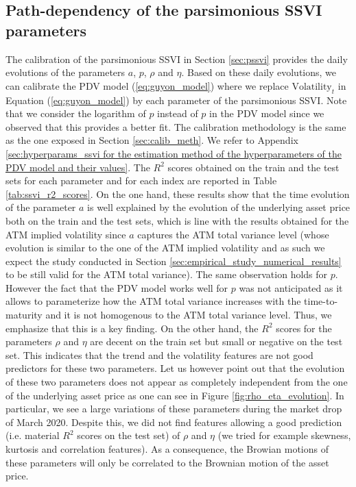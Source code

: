 \subsection{Path-dependency of the parsimonious SSVI parameters}\label{sec:pdv_ssvi_params}
The calibration of the parsimonious SSVI in Section \ref{sec:pssvi} provides the daily evolutions of the parameters $a$, $p$, $\rho$ and $\eta$. Based on these daily evolutions, we can calibrate the PDV model (\ref{eq:guyon_model}) where we replace $\text{Volatility}_t$ in Equation (\ref{eq:guyon_model}) by each parameter of the parsimonious SSVI. Note that we consider the logarithm of $p$ instead of $p$ in the PDV model since we observed that this provides a better fit. The calibration methodology is the same as the one exposed in Section \ref{sec:calib_meth}. We refer to Appendix \ref{sec:hyperparams_ssvi for the estimation method of the hyperparameters of the PDV model and their values}. The $R^2$ scores obtained on the train and the test sets for each parameter and for each index are reported in Table \ref{tab:ssvi_r2_scores}. On the one hand, these results show that the time evolution of the parameter $a$ is well explained by the evolution of the underlying asset price both on the train and the test sets, which is line with the results obtained for the ATM implied volatility since $a$ captures the ATM total variance level (whose evolution is similar to the one of the ATM implied volatility and as such we expect the study conducted in Section \ref{sec:empirical_study_numerical_results} to be still valid for the ATM total variance). The same observation holds for $p$. However the fact that the PDV model works well for $p$ was not anticipated as it allows to parameterize how the ATM total variance increases with the time-to-maturity and it is not homogenous to the ATM total variance level. Thus, we emphasize that this is a key finding. On the other hand, the $R^2$ scores for the parameters $\rho$ and $\eta$ are decent on the train set but small or negative on the test set. This indicates that the trend and the volatility features are not good predictors for these two parameters. Let us however point out that the evolution of these two parameters does not appear as completely independent from the one of the underlying asset price as one can see in Figure \ref{fig:rho_eta_evolution}. In particular, we see a large variations of these parameters during the market drop of March 2020. Despite this, we did not find features allowing a good prediction (i.e. material $R^2$ scores on the test set) of $\rho$ and $\eta$ (we tried for example skewness, kurtosis and correlation features). As a consequence, the Browian motions of these parameters will only be correlated to the Brownian motion of the asset price. 

